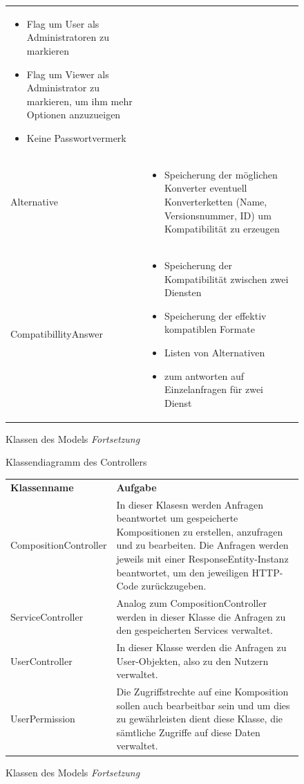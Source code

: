 \begin{figure}[h]
\begin{tabularx}{\textwidth}{p{} | X}
\begin{itemize}
			\item Flag um User als Administratoren zu markieren
			\item Flag um Viewer als Administrator zu markieren, um ihm mehr Optionen anzuzueigen
			\item Keine Passwortvermerk
		\end{itemize}\\
		Alternative & \begin{itemize}
			\item Speicherung der möglichen Konverter eventuell Konverterketten (Name, Versionsnummer, ID) um Kompatibilität zu erzeugen
		\end{itemize}\\
		\rowcolor[HTML]{E7E7E7}
		CompatibillityAnswer & \begin{itemize}
			\item Speicherung der Kompatibilität zwischen zwei Diensten
			\item Speicherung der effektiv kompatiblen Formate
			\item Listen von Alternativen
			\item zum antworten auf Einzelanfragen für zwei Dienst
		\end{itemize}\\
	\end{tabularx}
	\caption{Klassen des Models \textit{Fortsetzung}}
\end{figure}



\begin{figure}[h]
	\centering
	\caption{Klassendiagramm des Controllers}
	\label{fig:klassendiagramm-a}
\end{figure}

\begin{figure}[h]
	\begin{tabularx}{\textwidth}{p{} | X}
		\rowcolor[HTML]{C0C0C0}
		\textbf{Klassenname} & \textbf{Aufgabe} \\
		CompositionController & In dieser Klasesn werden Anfragen beantwortet um gespeicherte Kompositionen zu erstellen, anzufragen und zu bearbeiten.
		Die Anfragen werden jeweils mit einer ResponseEntity-Instanz beantwortet, um den jeweiligen HTTP-Code zurückzugeben.\\
		\rowcolor[HTML]{E7E7E7}
		ServiceController & Analog zum CompositionController werden in dieser Klasse die Anfragen zu den gespeicherten Services verwaltet.\\
		UserController & In dieser Klasse werden die Anfragen zu User-Objekten, also zu den Nutzern verwaltet.\\
		\rowcolor[HTML]{E7E7E7}
		UserPermission & Die Zugriffstrechte auf eine Komposition sollen auch bearbeitbar sein und um dies zu gewährleisten dient diese Klasse, die sämtliche Zugriffe auf diese Daten verwaltet.
	\end{tabularx}
	\caption{Klassen des Models \textit{Fortsetzung}}
\end{figure}

